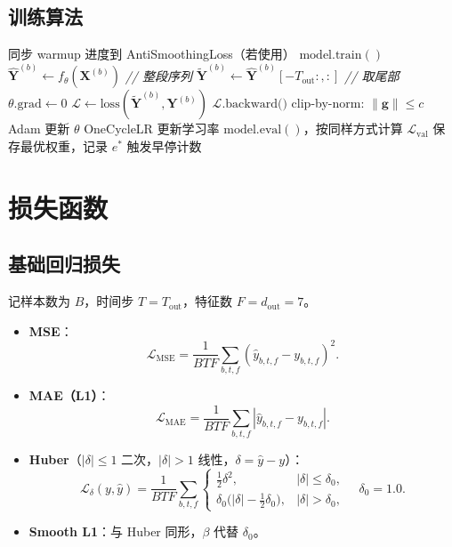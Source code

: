 \documentclass[11pt,a4paper]{article}
\newcommand{\mat}[1]{\bm{#1}}
\newcommand{\vect}[1]{\bm{#1}}
\begin{document}
\subsection{训练算法}
\begin{algorithm}[ht]
\caption{单 epoch 训练 / 验证（mini-batch SGD with Adam + OneCycleLR）}
\begin{algorithmic}[1]
  \STATE 同步 warmup 进度到 AntiSmoothingLoss（若使用）
  \STATE $\text{model.train}()$
  \FOR{each batch $(\mat{X}^{(b)}, \mat{Y}^{(b)})$}
    \STATE $\widehat{\mat{Y}}^{(b)} \gets f_{\theta}(\mat{X}^{(b)})$  \emph{// 整段序列}
    \STATE $\widetilde{\mat{Y}}^{(b)} \gets \widehat{\mat{Y}}^{(b)}[-T_{\text{out}}:, :]$  \emph{// 取尾部}
    \STATE $\theta.\text{grad} \gets 0$
    \STATE $\mathcal{L} \gets \mathrm{loss}(\widetilde{\mat{Y}}^{(b)}, \mat{Y}^{(b)})$
    \STATE $\mathcal{L}.\text{backward()}$
    \STATE clip-by-norm: $\|\vect{g}\| \le c$
    \STATE Adam 更新 $\theta$
    \STATE OneCycleLR 更新学习率
  \ENDFOR
  \STATE $\text{model.eval}()$，按同样方式计算 $\mathcal{L}_{\text{val}}$
    \STATE 保存最优权重，记录 $e^{*}$
  \ELSE
    \STATE 触发早停计数
  \ENDIF
\ENDFOR
\end{algorithmic}
\end{algorithm}

\section{损失函数}

\subsection{基础回归损失}
记样本数为 $B$，时间步 $T = T_{\text{out}}$，特征数 $F = d_{\text{out}} = 7$。
\begin{itemize}[leftmargin=*]
  \item \textbf{MSE}：
  \[
  \mathcal{L}_{\text{MSE}} = \frac{1}{BTF}\sum_{b,t,f}(\widehat{y}_{b,t,f} - y_{b,t,f})^2.
  \]
  \item \textbf{MAE（L1）}：
  \[
  \mathcal{L}_{\text{MAE}} = \frac{1}{BTF}\sum_{b,t,f}|\widehat{y}_{b,t,f} - y_{b,t,f}|.
  \]
  \item \textbf{Huber}（$|\delta| \le 1$ 二次，$|\delta| > 1$ 线性，$\delta = \widehat y - y$）：
  \[
  \mathcal{L}_{\delta}(y,\widehat{y}) = \frac{1}{BTF}\sum_{b,t,f}
  \begin{cases}
  \tfrac{1}{2}\delta^2, & |\delta| \le \delta_0,\\
  \delta_0\bigl(|\delta| - \tfrac{1}{2}\delta_0\bigr), & |\delta| > \delta_0,
  \end{cases}
  \quad \delta_0 = 1.0.
  \]
  \item \textbf{Smooth L1}：与 Huber 同形，$\beta$ 代替 $\delta_0$。
\end{itemize}
\end{document}
